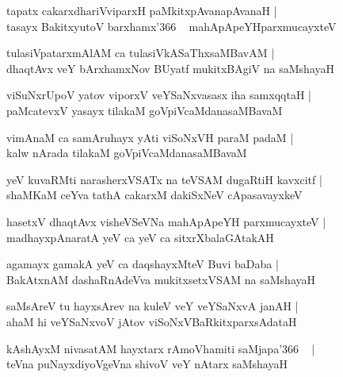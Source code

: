 \documentclass[twoside,12pt,openright]{book}
\newcounter{shloka}[chapter]
\begin{document}
\begin{shloka}%
tapatx cakarxdhariVviparxH paMkitxpAvanapAvanaH |\\
tasayx BakitxyutoV barxhamx\char'366 ~ mahApApeYHparxmucayxteV 
\end{shloka}

\begin{shloka}%
tulasiVpatarxmAlAM ca tulasiVkASaThxsaMBavAM |\\
dhaqtAvx veY bArxhamxNov BUyatf mukitxBAgiV na saMshayaH 
\end{shloka}

\begin{shloka}%
viSuNxrUpoV yatov viporxV veYSaNxvasasx iha samxqqtaH |\\
paMcatevxV yasayx tilakaM goVpiVcaMdanasaMBavaM
\end{shloka}

\begin{shloka}%
vimAnaM ca samAruhayx yAti viSoNxVH paraM padaM |\\
kalw nArada tilakaM goVpiVcaMdanasaMBavaM
\end{shloka}

\begin{shloka}%
yeV kuvaRMti narasherxVSATx na teVSAM dugaRtiH kavxcitf |\\
shaMKaM ceYva tathA cakarxM dakiSxNeV cApasavayxkeV 
\end{shloka}

\begin{shloka}%
hasetxV dhaqtAvx visheVSeVNa mahApApeYH parxmucayxteV |\\
madhayxpAnaratA yeV ca yeV ca sitxrXbalaGAtakAH 
\end{shloka}

\begin{shloka}%
agamayx gamakA yeV ca daqshayxMteV Buvi baDaba |\\
BakAtxnAM dashaRnAdeVva mukitxsetxVSAM na saMshayaH
\end{shloka}

\begin{shloka}%
saMsAreV tu hayxsArev na kuleV veY veYSaNxvA janAH |\\
ahaM hi veYSaNxvoV jAtov viSoNxVBaRkitxparxsAdataH 
\end{shloka}

\begin{shloka}%
kAshAyxM nivasatAM hayxtarx rAmoVhamiti saMjapa\char'366 ~ |\\
teVna puNayxdiyoVgeVna shivoV veY nAtarx saMshayaH
\end{shloka}
\end{document}
